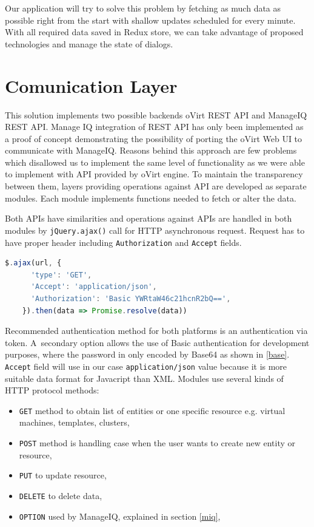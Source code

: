 Our application will try to solve this problem by fetching as much data as possible right from the start with shallow updates scheduled for every minute. With all required data saved in Redux store, we can take advantage of proposed technologies and manage the state of dialogs.

\section{Comunication Layer}
This solution implements two possible backends oVirt REST API and ManageIQ REST API. Manage IQ integration of REST API has only been implemented as a proof of concept demonstrating the possibility of porting the oVirt Web UI to communicate with ManageIQ. Reasons behind this approach are few problems which disallowed us to implement the same level of functionality as we were able to implement with API provided by oVirt engine. To maintain the transparency between them, layers providing operations against API are developed as separate modules. Each module implements functions needed to fetch or alter the data.

Both APIs have similarities and operations against APIs are handled in both modules by \texttt{jQuery.ajax()}\cite{ajax} call for HTTP asynchronous request.
Request has to have proper header including \texttt{Authorization} and \texttt{Accept} fields. 

\bigskip
\begin{lstlisting}[language=javascript,xleftmargin=3.5ex,caption={Fetching data from ManageIQ with Basic Authentication}]
$.ajax(url, {
      'type': 'GET',
      'Accept': 'application/json',
      'Authorization': 'Basic YWRtaW46c21hcnR2bQ==',
    }).then(data => Promise.resolve(data))
\end{lstlisting}\label{base}
\bigskip
  
Recommended authentication method for both platforms is an authentication via token. A~secondary option allows the use of Basic authentication for development purposes, where the password in only encoded by Base64 as shown in \ref{base}.
\texttt{Accept} field will use in our case \texttt{application/json} value because it is more suitable data format for Javacript than XML. Modules use several kinds of HTTP protocol methods: 
\begin{itemize}
\item \texttt{GET} method to obtain list of entities or one specific resource e.g. virtual machines, templates, clusters,
\item \texttt{POST} method is handling case when the user wants to create new entity or resource,
\item \texttt{PUT} to update resource,
\item \texttt{DELETE} to delete data,
\item \texttt{OPTION} used by ManageIQ, explained in section \ref{miq},
\end{itemize}

